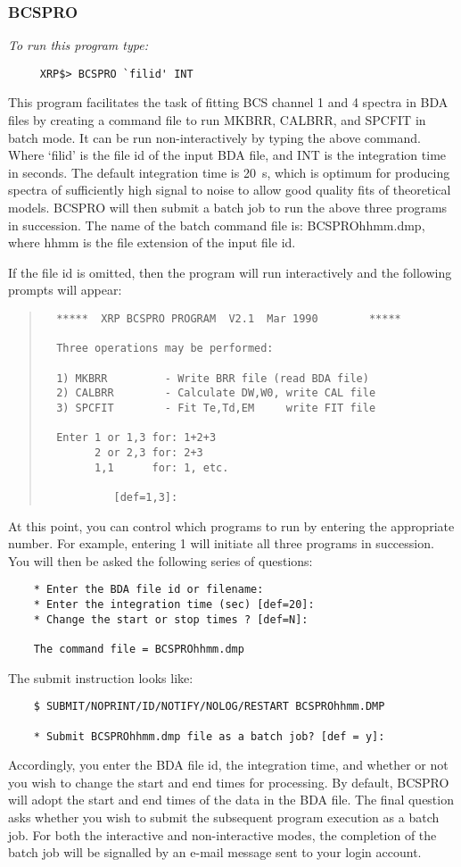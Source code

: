 \subsubsection{BCSPRO}

{\em To run this program type:}
\begin{verbatim}
     XRP$> BCSPRO `filid' INT
\end{verbatim}
This program facilitates the task of fitting BCS channel 1 and 4 spectra in BDA
files by creating a command file to run MKBRR, CALBRR, and SPCFIT in batch
mode. It can be run non-interactively by typing the above command.
Where `filid' is the file id of the input BDA file, and INT is the
integration time in seconds. The default integration time is 20~s, which is
optimum for producing spectra of sufficiently high signal to noise to allow
good quality fits of theoretical models.  BCSPRO will then submit a batch job
to run the above three programs in succession. The name of the batch command
file is: BCSPROhhmm.dmp, where hhmm is the file extension of the input file id.

If the file id is omitted, then the program will run interactively
and the following prompts will appear:
\begin{quote}
\begin{verbatim}
  *****  XRP BCSPRO PROGRAM  V2.1  Mar 1990        *****

  Three operations may be performed:

  1) MKBRR         - Write BRR file (read BDA file)
  2) CALBRR        - Calculate DW,W0, write CAL file
  3) SPCFIT        - Fit Te,Td,EM     write FIT file

  Enter 1 or 1,3 for: 1+2+3
        2 or 2,3 for: 2+3
        1,1      for: 1, etc.

           [def=1,3]:
\end{verbatim}
\end{quote}
At this point, you can control which programs to run by entering the
appropriate number. For example, entering 1 will initiate all three programs in
succession. You will then be asked the following series of questions:
\begin{verbatim}
    * Enter the BDA file id or filename:
    * Enter the integration time (sec) [def=20]:
    * Change the start or stop times ? [def=N]:

    The command file = BCSPROhhmm.dmp
\end{verbatim}
The submit instruction looks like:
\begin{verbatim}
    $ SUBMIT/NOPRINT/ID/NOTIFY/NOLOG/RESTART BCSPROhhmm.DMP

    * Submit BCSPROhhmm.dmp file as a batch job? [def = y]:
\end{verbatim}
Accordingly, you enter the BDA file id, the integration time,  and
whether or not you wish to change the start and end times for processing.  By
default, BCSPRO will adopt the start and end times of the data in the BDA file.
The final question asks whether you wish to submit the subsequent program
execution as a batch job. For both the interactive and non-interactive modes,
the completion of the batch job will be signalled by an e-mail message sent to
your login account.

